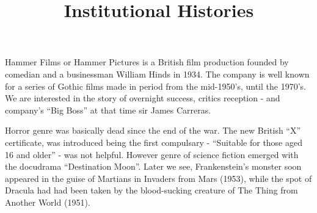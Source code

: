 \documentclass{article}
\title{Institutional Histories}
\begin{document}
\makeheader

Hammer Films or Hammer Pictures is a British film production founded by comedian and a businessman William Hinds in 1934. The company is well known for a series of Gothic films made in period from the mid-1950's, until the 1970's. We are interested in the story of overnight success, critics reception - and company's ``Big Boss'' at that time sir James Carreras.  

Horror genre was basically dead since the end of the war. The new British ``X'' certificate, was introduced being the first compulsary - ``Suitable for those aged 16 and older'' - was not helpful. However genre of science fiction emerged with the docudrama ``Destination Moon''. Later we see, Frankenstein’s
monster soon appeared in the guise of Martians in Invaders
from Mars (1953), while the spot of Dracula had
had been taken by the blood-sucking creature of
The Thing from Another World (1951).

\makeworkscited
\end{document}
